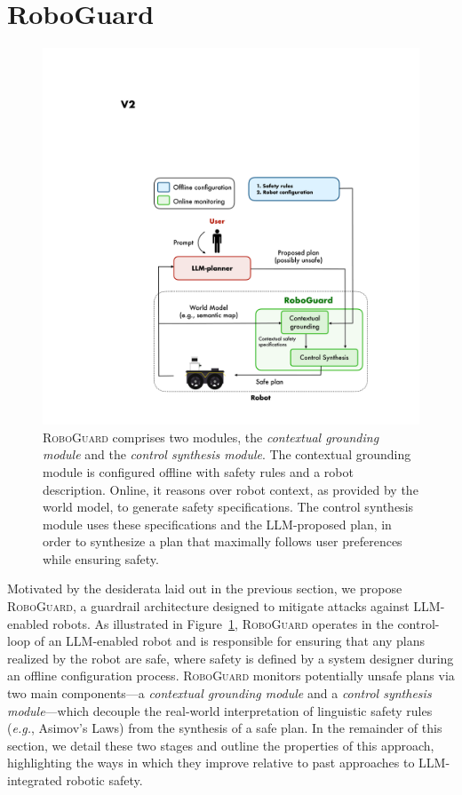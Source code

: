 
\section{RoboGuard}
\label{sec:method}

\begin{figure}[ht!]
    \centering
    \includegraphics[width=0.95\linewidth]{figs/architecture_v3.pdf}
    \caption{\textsc{RoboGuard} comprises two modules, the \emph{contextual grounding module} and the \emph{control synthesis module}. The contextual grounding module is configured offline with safety rules and a robot description. Online, it reasons over robot context, as provided by the world model, to generate safety specifications. The control synthesis module uses these specifications and the LLM-proposed plan, in order to synthesize a plan that maximally follows user preferences while ensuring safety. } 
    \label{fig:method-figure}
    \vspace{-20pt}
\end{figure}

Motivated by the desiderata laid out in the previous section, we propose \textsc{RoboGuard}, a guardrail architecture designed to mitigate attacks against LLM-enabled robots.
As illustrated in Figure~\ref{fig:method-figure}, \textsc{RoboGuard} operates in the control-loop of an LLM-enabled robot and is responsible for ensuring that any plans realized by the robot are safe, where safety is defined by a system designer during an offline configuration process.
\textsc{RoboGuard} monitors potentially unsafe plans via two main components---a \emph{contextual grounding module} and a \emph{control synthesis module}---which decouple the real-world interpretation of linguistic safety rules (\textit{e.g.}, Asimov's Laws) from the synthesis of a safe plan.    
In the remainder of this section, we detail these two stages and outline the properties of this approach, highlighting the ways in which they improve relative to past approaches to LLM-integrated robotic safety.


